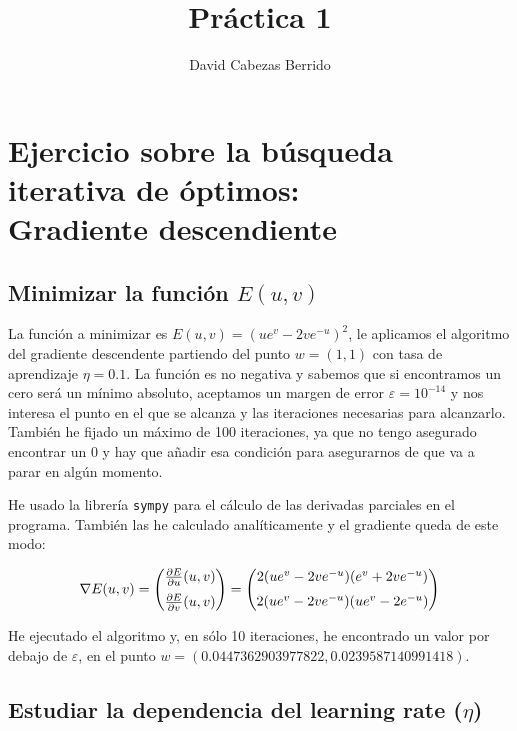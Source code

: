 \documentclass[a4]{article}
\author{David Cabezas Berrido}
\date{\vspace{-5mm}}
\title{\huge Práctica 1 \HRule\vspace{-4mm}}
\begin{document}
\maketitle
\tableofcontents

\section{Ejercicio sobre la búsqueda iterativa de óptimos: \\ Gradiente descendiente}

\subsection{Minimizar la función $E(u,v)$}

La función a minimizar es $E(u,v)=(ue^v-2ve^{-u})^2$, le aplicamos el algoritmo del gradiente 
descendente partiendo del punto $w=(1,1)$ con tasa de aprendizaje $\eta=0.1$.
La función es no negativa y sabemos que si encontramos un cero será un mínimo absoluto,
aceptamos un margen de error $\varepsilon=10^{-14}$ y nos interesa el punto en el que se alcanza
y las iteraciones necesarias para alcanzarlo. También he fijado un máximo de 100 iteraciones,
ya que no tengo asegurado encontrar un 0 y hay que añadir esa condición para asegurarnos
de que va a parar en algún momento.

He usado la librería \texttt{sympy} para el cálculo de las derivadas parciales en el programa.
También las he calculado analíticamente y el gradiente queda de este modo:

\begin{equation*}
\nabla E(u,v)=
\begin{pmatrix}
\frac{\partial E}{\partial u}(u,v) \vspace{2mm}\\
\frac{\partial E}{\partial v}(u,v)
\end{pmatrix}=
\begin{pmatrix}
    2(ue^v-2ve^{-u})(e^v+2ve^{-u}) \vspace{2mm}\\
    2(ue^v-2ve^{-u})(ue^v-2e^{-u})
    \end{pmatrix}
\end{equation*}

He ejecutado el algoritmo y, en sólo 10 iteraciones, he encontrado un valor por debajo de $\varepsilon$,
en el punto $w=(0.0447362903977822,0.0239587140991418)$.

\subsection{Estudiar la dependencia del \textbf{learning rate} ($\eta$)}
\end{document}

